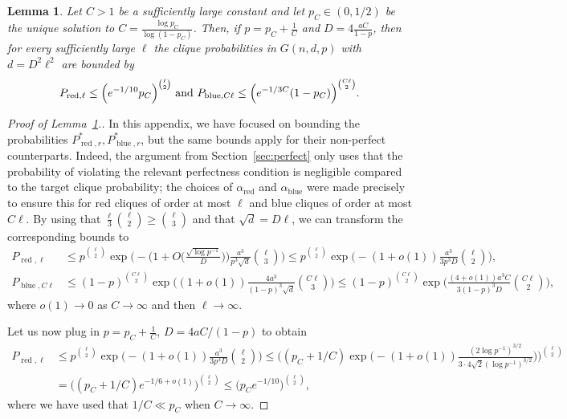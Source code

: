 \documentclass[11pt]{amsart}
\newtheorem{lemma}[theorem]{\bf Lemma}
\theoremstyle{definition}
\DeclareMathOperator{\red}{red}
\DeclareMathOperator{\blue}{blue}
\begin{document}
\begin{lemma}\label{lemma:bookkeeping_appendix}
Let $C>1$ be a sufficiently large constant and let $p_C\in (0, 1/2)$ be the unique solution to $C=\frac{\log p_C}{\log (1-p_C)}$. Then, if $p=p_C+\frac{1}{C}$ and $D=4\frac{aC}{1-p}$, then for every sufficiently large $\ell$ the clique probabilities in $G(n, d, p)$  with $d=D^2\ell^2$ are bounded by
{\smaller[0.3]
\[P_{{\rm red}, \ell}\leq \Big(e^{-1/10}p_C\Big)^{\binom{\ell}{2}} \text{ and } P_{{\rm blue}, C\ell}\leq \Big(e^{-1/3C}(1-p_C)\Big)^{\binom{C\ell}{2}}.\]
}
\end{lemma}
\begin{proof}[Proof of Lemma~\ref{lemma:bookkeeping_appendix}.]
In this appendix, we have focused on bounding the probabilities $P_{\red, r}^*, P_{\blue, r}^*$, but the same bounds apply for their non-perfect counterparts. Indeed, the argument from Section~\ref{sec:perfect} only uses that the probability of violating the relevant perfectness condition is negligible compared to the target clique probability; the choices of $\alpha_{\red}$ and $\alpha_{\blue}$ were made precisely to ensure this for red cliques of order at most $\ell$ and blue cliques of order at most $C\ell$. By using that $\frac{\ell}{3}\binom{\ell}{2}\geq \binom{\ell}{3}$ and that $\sqrt{d}=D\ell$, we can transform the corresponding bounds to
{\smaller[0.3]
\begin{align*}
P_{\red, \ell}&\leq p^{\binom{\ell}{2}}\exp\Big(-\Big(1+O\Big(\frac{\sqrt{\log p^{-1}}}{D}\Big)\Big)\frac{a^3}{p^3\sqrt{d}} \binom{\ell}{3}\Big)\leq p^{\binom{\ell}{2}}\exp\Big(-(1+o(1))\frac{a^3}{3p^3D}\binom{\ell}{2}\Big),\\
P_{\blue, C\ell}&\leq (1-p)^{\binom{C\ell}{2}}\exp\Big((1+o(1))\frac{4a^3}{(1-p)^3\sqrt{d}}\binom{C\ell}{3}\Big)\leq (1-p)^{\binom{C\ell}{2}}\exp\Big(\frac{(4+o(1))a^3C}{3(1-p)^3D}\binom{C\ell}{2}\Big),
\end{align*}
}
where $o(1)\to 0$ as $C\to \infty$ and then $\ell\to\infty$.

Let us now plug in $p=p_C+\frac{1}{C}$, $D=4aC/(1-p)$ to obtain
{\smaller[0.3]
\begin{align*}
P_{\red, \ell}&\leq p^{\binom{\ell}{2}}\exp\Big(-(1+o(1))\frac{a^3}{3p^3D}\binom{\ell}{2}\Big)\leq \Big((p_C+1/C) \exp\Big(-(1+o(1))\frac{(2\log p^{-1})^{3/2}}{3\cdot 4\sqrt{2}(\log p^{-1})^{3/2}}\Big)\Big)^{\binom{\ell}{2}}\\
&=\Big((p_C+1/C) e^{-1/6+o(1)}\Big)^{\binom{\ell}{2}}\leq \Big(p_Ce^{-1/10}\Big)^{\binom{\ell}{2}},
\end{align*}
}
where we have used that $1/C\ll p_C$ when $C\to \infty$.


\end{proof}
\end{document}
